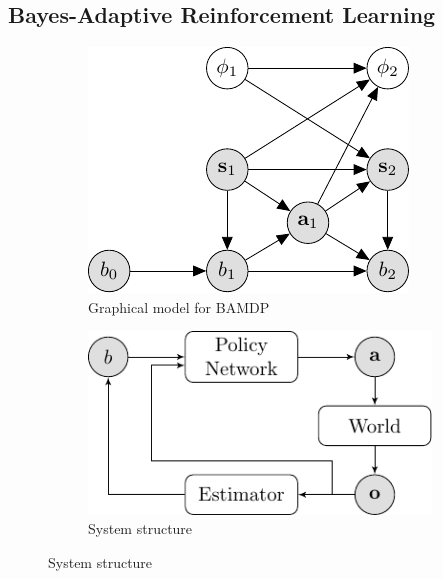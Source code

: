 \documentclass{article}
\begin{document}
\subsection{Bayes-Adaptive Reinforcement Learning}
\begin{figure}[t!]
\begin{subfigure}[b]{0.5\textwidth}
\centering
\includegraphics[width=0.8\linewidth]{figs/model.pdf}
\caption{Graphical model for BAMDP}
\end{subfigure}
\begin{subfigure}[b]{0.45\textwidth}
\centering
\includegraphics[width=\linewidth]{figs/system_structure.pdf}
\caption{System structure}
\end{subfigure}
\end{figure}
\end{document}
